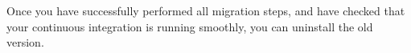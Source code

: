 Once you have successfully performed all migration steps, and have checked that your continuous integration is running smoothly, you can uninstall the old version. 

